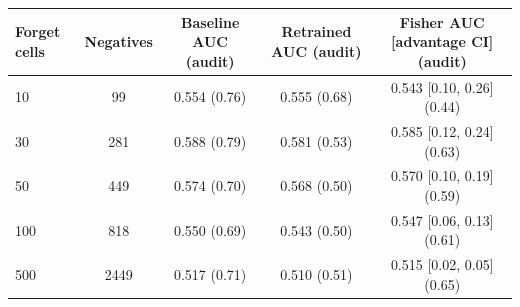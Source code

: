 \begin{tabular}{lcccc}
\toprule
Forget cells & Negatives & Baseline AUC (audit) & Retrained AUC (audit) & Fisher AUC [advantage CI] (audit) \\
\midrule
10 & 99 & 0.554 (0.76) & 0.555 (0.68) & 0.543 [0.10, 0.26] (0.44) \\
30 & 281 & 0.588 (0.79) & 0.581 (0.53) & 0.585 [0.12, 0.24] (0.63) \\
50 & 449 & 0.574 (0.70) & 0.568 (0.50) & 0.570 [0.10, 0.19] (0.59) \\
100 & 818 & 0.550 (0.69) & 0.543 (0.50) & 0.547 [0.06, 0.13] (0.61) \\
500 & 2449 & 0.517 (0.71) & 0.510 (0.51) & 0.515 [0.02, 0.05] (0.65) \\
\bottomrule
\end{tabular}
